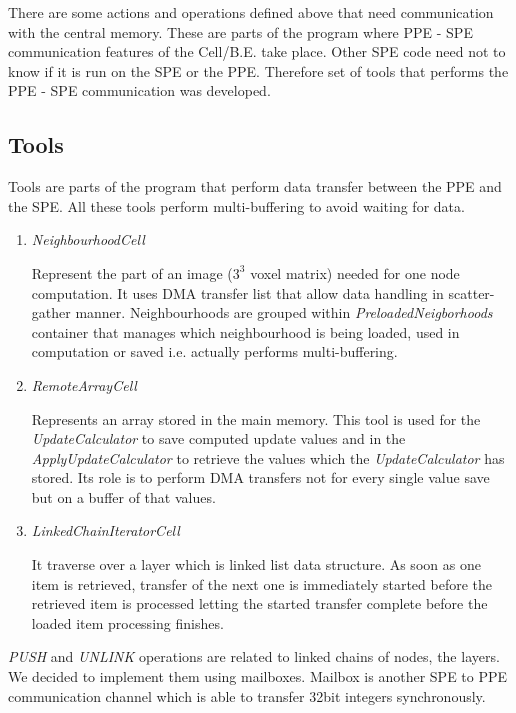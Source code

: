 
\par
There are some actions and operations defined above that need communication with the central memory.
These are parts of the program where PPE - SPE communication features of the \mbox{Cell/B.E.} take place.
Other SPE code need not to know if it is run on the SPE or the PPE.
Therefore set of tools that performs the PPE - SPE communication was developed.

\subsection{Tools}
Tools are parts of the program that perform data transfer between the PPE and the SPE.
All these tools perform multi-buffering to avoid waiting for data.

\begin{enumerate}
\item \emph{NeighbourhoodCell}
\par
Represent the part of an image ($3^3$ voxel matrix) needed for one node computation.
It uses DMA transfer list that allow data handling in scatter-gather manner.
Neighbourhoods are grouped within \mbox{\emph{PreloadedNeigborhoods}} container that manages which neighbourhood is being loaded, used in computation or saved i.e. actually performs multi-buffering.

\item \emph{RemoteArrayCell}
\par
Represents an array stored in the main memory.
This tool is used for the \mbox{\emph{UpdateCalculator}} to save computed update values and in the \mbox{\emph{ApplyUpdateCalculator}} to retrieve the values which the \mbox{\emph{UpdateCalculator}} has stored.
Its role is to perform DMA transfers not for every single value save but on a buffer of that values.

\item \emph{LinkedChainIteratorCell}
\par
It traverse over a layer which is linked list data structure.
As soon as one item is retrieved, transfer of the next one is immediately started before the retrieved item is processed letting the started transfer complete before the loaded item processing finishes.
\end{enumerate}

\par
\emph{PUSH} and \emph{UNLINK} operations are related to linked chains of nodes, the layers.
We decided to implement them using mailboxes.
Mailbox is another SPE to PPE communication channel which is able to transfer 32bit integers synchronously.

